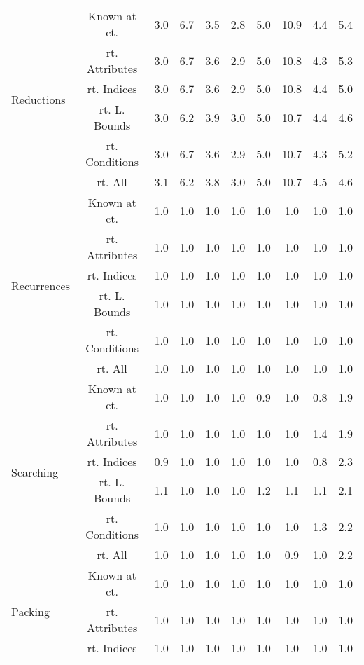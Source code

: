 \documentclass{article}
\begin{document}
\begin{longtable}{|p{2cm}||c|c|c|c|c|c|c|c|c|}
\hline
\multirow{6}{*}{ \parbox{2cm}{Reductions}} & Known at ct. & 3.0 & 6.7 & 3.5 & 2.8 & 5.0 & 10.9 & 4.4 & 5.4\\ \cline{2-10}
 & rt. Attributes & 3.0 & 6.7 & 3.6 & 2.9 & 5.0 & 10.8 & 4.3 & 5.3\\ \cline{2-10}
 & rt. Indices & 3.0 & 6.7 & 3.6 & 2.9 & 5.0 & 10.8 & 4.4 & 5.0\\ \cline{2-10}
 & rt. L. Bounds & 3.0 & 6.2 & 3.9 & 3.0 & 5.0 & 10.7 & 4.4 & 4.6\\ \cline{2-10}
 & rt. Conditions & 3.0 & 6.7 & 3.6 & 2.9 & 5.0 & 10.7 & 4.3 & 5.2\\ \cline{2-10}
 & rt. All & 3.1 & 6.2 & 3.8 & 3.0 & 5.0 & 10.7 & 4.5 & 4.6\\ \cline{2-10}
\hline
\multirow{6}{*}{ \parbox{2cm}{Recurrences}} & Known at ct. & 1.0 & 1.0 & 1.0 & 1.0 & 1.0 & 1.0 & 1.0 & 1.0\\ \cline{2-10}
 & rt. Attributes & 1.0 & 1.0 & 1.0 & 1.0 & 1.0 & 1.0 & 1.0 & 1.0\\ \cline{2-10}
 & rt. Indices & 1.0 & 1.0 & 1.0 & 1.0 & 1.0 & 1.0 & 1.0 & 1.0\\ \cline{2-10}
 & rt. L. Bounds & 1.0 & 1.0 & 1.0 & 1.0 & 1.0 & 1.0 & 1.0 & 1.0\\ \cline{2-10}
 & rt. Conditions & 1.0 & 1.0 & 1.0 & 1.0 & 1.0 & 1.0 & 1.0 & 1.0\\ \cline{2-10}
 & rt. All & 1.0 & 1.0 & 1.0 & 1.0 & 1.0 & 1.0 & 1.0 & 1.0\\ \cline{2-10}
\hline
\multirow{6}{*}{ \parbox{2cm}{Searching}} & Known at ct. & 1.0 & 1.0 & 1.0 & 1.0 & 0.9 & 1.0 & 0.8 & 1.9\\ \cline{2-10}
 & rt. Attributes & 1.0 & 1.0 & 1.0 & 1.0 & 1.0 & 1.0 & 1.4 & 1.9\\ \cline{2-10}
 & rt. Indices & 0.9 & 1.0 & 1.0 & 1.0 & 1.0 & 1.0 & 0.8 & 2.3\\ \cline{2-10}
 & rt. L. Bounds & 1.1 & 1.0 & 1.0 & 1.0 & 1.2 & 1.1 & 1.1 & 2.1\\ \cline{2-10}
 & rt. Conditions & 1.0 & 1.0 & 1.0 & 1.0 & 1.0 & 1.0 & 1.3 & 2.2\\ \cline{2-10}
 & rt. All & 1.0 & 1.0 & 1.0 & 1.0 & 1.0 & 0.9 & 1.0 & 2.2\\ \cline{2-10}
\hline
\multirow{6}{*}{ \parbox{2cm}{Packing}} & Known at ct. & 1.0 & 1.0 & 1.0 & 1.0 & 1.0 & 1.0 & 1.0 & 1.0\\ \cline{2-10}
 & rt. Attributes & 1.0 & 1.0 & 1.0 & 1.0 & 1.0 & 1.0 & 1.0 & 1.0\\ \cline{2-10}
 & rt. Indices & 1.0 & 1.0 & 1.0 & 1.0 & 1.0 & 1.0 & 1.0 & 1.0\\ \cline{2-10}

\end{longtable}
\end{document}
